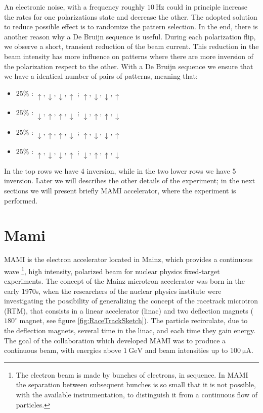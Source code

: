 An electronic noise, with a frequency roughly $\SI{10}{\hertz}$ could in principle increase the rates for one polarizations state and decrease the other. The adopted solution to reduce possible effect is to randomize the pattern selection. In the end, there is another reason why a De Bruijn sequence is useful. During each polarization flip, we observe a short, transient reduction of the beam current. This reduction in the beam intensity has more influence on patterns where there are more inversion of the polarization respect to the other. With a De Bruijn sequence we ensure that we have a identical number of pairs of patterns, meaning that:

\begin{itemize}
\item $25\%$ : $\uparrow,\downarrow,\downarrow, \uparrow$ ; $\uparrow,\downarrow,\downarrow, \uparrow$
\item $25\%$ : $\downarrow,\uparrow, \uparrow,\downarrow$ ; $\downarrow,\uparrow, \uparrow,\downarrow$
\item $25\%$ : $\downarrow,\uparrow, \uparrow,\downarrow$ ; $\uparrow,\downarrow,\downarrow, \uparrow$
\item $25\%$ : $\uparrow,\downarrow,\downarrow, \uparrow$ ; $\downarrow,\uparrow, \uparrow,\downarrow$
\end{itemize}

In the top rows we have 4 inversion, while in the two lower rows we have 5 inversion. \smallskip
Later we will describes the other details of the experiment; in the next sections we will present briefly MAMI accelerator, where the experiment is performed. 

\section{Mami}

MAMI is the electron accelerator located in Mainz, which provides a continuous wave \footnote{The electron beam is made by bunches of electrons, in sequence. In MAMI the separation between subsequent bunches is so small that it is not possible, with the available instrumentation, to distinguish it from a continuous flow of particles.}, high intensity, polarized beam for nuclear physics fixed-target experiments. The concept of the Mainz microtron accelerator was born in the early 1970s, when the researchers of the nuclear physics institute were investigating the possibility of generalizing the concept of the racetrack microtron (RTM), that consists in a linear accelerator (linac) and two deflection magnets ($180^{\circ}$ magnet, see figure \ref{fig:RaceTrackSketch}). The particle recirculate, due to the deflection magnets, several time in the linac, and each time they gain energy.  The goal of the collaboration which developed MAMI was to produce a continuous beam, with energies above $\SI{1}{\giga \electronvolt}$ and beam intensities up to $\SI{100}{\micro \ampere}$.

